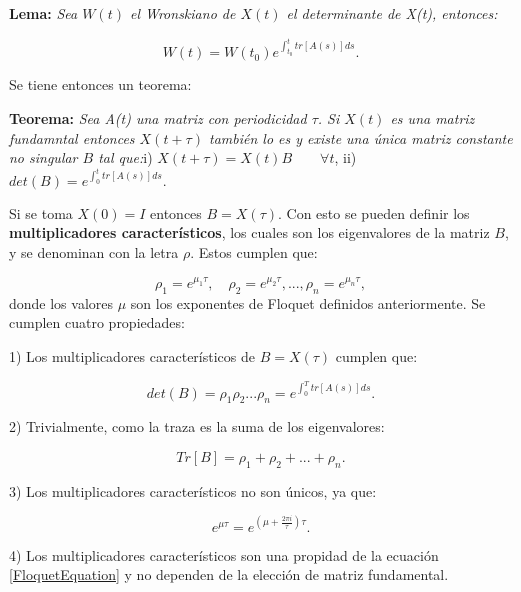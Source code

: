 \documentclass[a4paper,10pt]{report}
\begin{document}
\begin{center}
\textbf{Lema:} \textit{Sea $W(t)$ el Wronskiano de $X(t)$ el determinante de X(t), entonces:}

\begin{equation}
W(t) = W(t_0) e^{\int_{t_0}^{t}tr[A(s)]ds}.
\end{equation}
 
\end{center} Se tiene entonces un teorema:

\begin{center}
\textbf{Teorema:} \textit{Sea A(t) una matriz con periodicidad $\tau$. Si $X(t)$ es una matriz fundamntal entonces $X(t+\tau)$ también lo es y existe una única matriz constante no singular $B$ tal que:}\linebreak \linebreak i) $X(t+\tau) = X(t)B \qquad\forall t$, \linebreak ii) $det(B) = e^{\int_0^t tr[A(s)]ds}.$
\end{center}Si se toma $X(0)=I$ entonces $B=X(\tau)$. Con esto se pueden definir los \textbf{multiplicadores característicos}, los cuales son los eigenvalores de la matriz $B$, y se denominan con la letra $\rho$. Estos cumplen que:

\begin{equation}
\rho_1 = e^{\mu_1 \tau}, \quad \rho_2 = e^{\mu_2 \tau}, ... , \rho_n = e^{\mu_n \tau},
\end{equation} donde los valores $\mu$ son los exponentes de Floquet definidos anteriormente. Se cumplen cuatro propiedades:

1) Los multiplicadores característicos de $B=X(\tau)$ cumplen que:

\begin{equation}
det(B) = \rho_1 \rho_2 ... \rho_n = e^{\int_0^T tr[A(s)]ds}.
\end{equation}

2) Trivialmente, como la traza es la suma de los eigenvalores:

\begin{equation}
Tr[B] = \rho_1 + \rho_2 + ... + \rho_n.
\end{equation}

3) Los multiplicadores característicos no son únicos, ya que:

\begin{equation}
e^{\mu \tau} = e^{(\mu  +\frac{2\pi i}{\tau} )\tau}.
\end{equation}

4) Los multiplicadores característicos son una propidad de la ecuación \ref{FloquetEquation} y no dependen de la elección de matriz fundamental.
\end{document}
